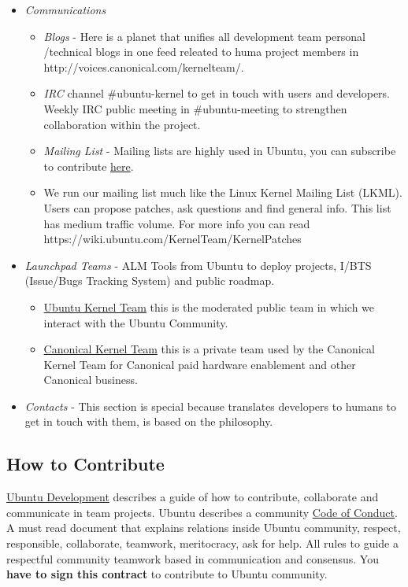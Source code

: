 \begin{itemize}
	\item \textit{Communications}
    \begin{itemize}
	    \item \textit{Blogs} - Here is a planet that unifies all development team personal /technical blogs in one feed releated to huma project members in http://voices.canonical.com/kernelteam/.
	    \item \textit{IRC} channel \#ubuntu-kernel to get in touch with users and developers. Weekly IRC  public meeting in \#ubuntu-meeting to strengthen collaboration within the project.
	    \item \textit{Mailing List} - Mailing lists are highly used in Ubuntu, you can subscribe to contribute \href{https://lists.ubuntu.com/mailman/listinfo/kernel-team}{here}.
	    \item We run our mailing list much like the Linux Kernel Mailing List (LKML). Users can propose patches, ask questions and find general info. This list has medium traffic volume. For more info you can read https://wiki.ubuntu.com/KernelTeam/KernelPatches
    \end{itemize}
	\item \textit{Launchpad Teams} - ALM Tools from Ubuntu to deploy projects, I/BTS (Issue/Bugs Tracking System) and public roadmap.
\begin{itemize}
	\item \href{https://launchpad.net/~ubuntu-kernel-team}{Ubuntu Kernel Team} this is the moderated public team in which we interact with the Ubuntu Community.
	\item \href{https://launchpad.net/~canonical-kernel-team}{Canonical Kernel Team} this is a private team used by the Canonical Kernel Team for Canonical paid hardware enablement and other Canonical business.
\end{itemize}
	\item \textit{Contacts} - This section is special because translates developers to humans to get in touch with them, is based on the philosophy.
\end{itemize}

\subsection{How to Contribute}

\par \href{https://wiki.ubuntu.com/UbuntuDevelopment}{Ubuntu Development} describes a guide of how to contribute, collaborate and communicate in team projects. Ubuntu describes a community \href{http://www.ubuntu.com/project/about-ubuntu/conduct}{Code of Conduct}. A must read document that explains relations inside Ubuntu community, respect, responsible, collaborate, teamwork, meritocracy, ask for help. All rules to guide a respectful community teamwork based in communication and consensus. You \textbf{have to sign this contract} to contribute to Ubuntu community.

